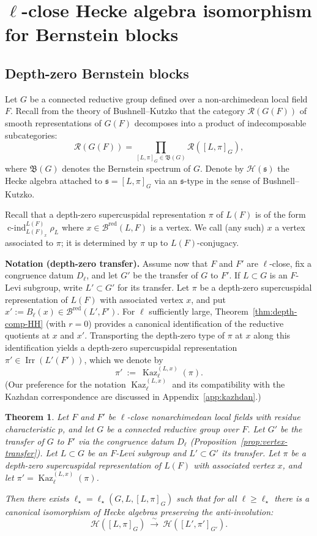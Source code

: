 \documentclass[american]{article}
\numberwithin{equation}{section}
\numberwithin{figure}{section}
\theoremstyle{plain}
\newtheorem{theorem}{Theorem}[section]
\theoremstyle{definition}
\theoremstyle{remark}
\DeclareMathOperator{\Irr}{Irr}
\DeclareMathOperator{\cind}{c-ind}
\DeclareMathOperator{\Kaz}{Kaz}
\DeclareMathOperator{\red}{red}
\newcommand{\cH}{\mathcal{H}}
\begin{document}
\section{$\ell$-close Hecke algebra isomorphism for Bernstein blocks}
\label{sec:hecke_iso_bernstein}

\subsection{Depth-zero Bernstein blocks}
Let $G$ be a connected reductive group defined over a non-archimedean local field $F$.
Recall from the theory of Bushnell--Kutzko that the category $\mathcal{R}(G(F))$ of smooth
representations of $G(F)$ decomposes into a product of indecomposable subcategories:
\[
\mathcal{R}(G(F))=\prod_{[L,\pi]_G\in \mathfrak{B}(G)} \mathcal{R}([L,\pi]_G),
\]
where $\mathfrak{B}(G)$ denotes the Bernstein spectrum of $G$.
Denote by $\cH(\mathfrak{s})$ the Hecke algebra attached to $\mathfrak{s}=[L,\pi]_G$
via an $\mathfrak{s}$-type in the sense of Bushnell--Kutzko.

Recall that a depth-zero supercuspidal representation $\pi$ of $L(F)$ is of the form
$\cind^{L(F)}_{L(F)_x}\rho_L$  where $x\in \mathcal{B}^{\red}(L,F)$ is a vertex.
We call (any such) $x$ a vertex associated to $\pi$; it is determined by $\pi$ up to $L(F)$-conjugacy.

\medskip
\noindent\textbf{Notation (depth-zero transfer).}
Assume now that $F$ and $F'$ are $\ell$-close, fix a congruence datum $D_\ell$, and let $G'$ be the
transfer of $G$ to $F'$. If $L\subset G$ is an $F$-Levi subgroup, write $L'\subset G'$ for its transfer.
Let $\pi$ be a depth-zero supercuspidal representation of $L(F)$ with associated vertex $x$, and put
$x':=B_\ell(x)\in \mathcal{B}^{\red}(L',F')$. For $\ell$ sufficiently large, Theorem~\ref{thm:depth-comp-HH} (with $r=0$)
provides a canonical identification of the reductive quotients at $x$ and $x'$. Transporting the
depth-zero type of $\pi$ at $x$ along this identification yields a depth-zero supercuspidal representation
$\pi'\in \Irr(L'(F'))$, which we denote by
\[
\pi'\ :=\ \Kaz^{(L,x)}_\ell(\pi).
\]
(Our preference for the notation $\Kaz^{(L,x)}_\ell$ and its compatibility with the Kazhdan correspondence
are discussed in Appendix~\ref{app:kazhdan}.)

\begin{theorem}\label{thm:ell-close-depth-zero-block}
Let $F$ and $F'$ be $\ell$-close nonarchimedean local fields with residue characteristic $p$, and let
$G$ be a connected reductive group over $F$. Let $G'$ be the transfer of $G$ to $F'$ via the congruence
datum $D_\ell$ (Proposition~\ref{prop:vertex-transfer}). Let $L\subset G$ be an $F$-Levi subgroup and
$L'\subset G'$ its transfer. Let $\pi$ be a depth-zero supercuspidal representation of $L(F)$ with
associated vertex $x$, and let $\pi'=\Kaz^{(L,x)}_\ell(\pi)$.

Then there exists $\ell_\star=\ell_\star(G,L,[L,\pi]_G)$ such that for all $\ell \ge \ell_\star$ there
is a canonical isomorphism of Hecke algebras preserving the anti-involution:
\[
\cH([L,\pi]_G)\ \xrightarrow{\ \sim\ }\ \cH([L',\pi']_{G'}).
\]
\end{theorem}
\end{document}
